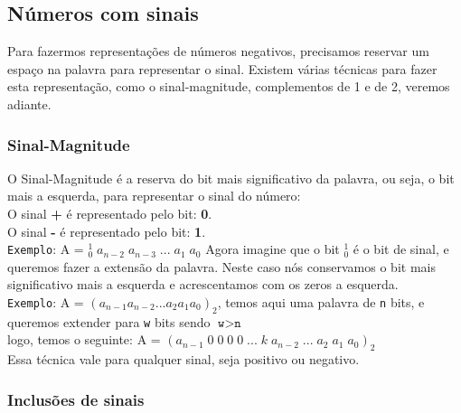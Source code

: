 \documentclass[12pt, onecolumn]{article}
\begin{document}
	\subsection{\centering Números com sinais}
	
	Para fazermos representações de números negativos, precisamos reservar 
	um espaço na palavra para representar o sinal. Existem várias técnicas 
	para fazer esta representação, como o sinal-magnitude, complementos de 
	1 e de 2, veremos adiante.

	\subsubsection{\centering Sinal-Magnitude}
	
	O Sinal-Magnitude é a reserva do bit mais significativo da palavra, 
	ou seja, o bit mais a esquerda, para representar o sinal do número: \\
	\newline
	O sinal \textbf{+} é representado pelo bit: \textbf{0}. \\
	O sinal \textbf{-} é representado pelo bit: \textbf{1}. \\
	\newline
	\texttt{Exemplo}: A = ${_0^1}\;a_{n-2}\;a_{n-3}\;...\;a_1\;a_0$
	Agora imagine que o bit $_0^1$ é o bit de sinal, e queremos fazer a
	extensão da palavra. Neste caso nós conservamos o bit mais
	significativo mais a esquerda e acrescentamos com os zeros a esquerda. \\
	\newline
	\texttt{Exemplo}: A = $(a_{n-1} a_{n-2} ... a_2 a_1 a_0)_2$, temos aqui
	uma palavra de \texttt{n} bits, e queremos extender para \texttt{w} bits
	sendo $\texttt{w} > \texttt{n}$ \\
	\newline
	logo, temos o seguinte: 
	A = $(a_{n-1}\;0\;0\;0\;0\;...\;k\;a_{n-2}\;...\;a_2\;a_1\;a_0)_2$ \\
	\newline
	Essa técnica vale para qualquer sinal, seja positivo ou negativo.
	
	\subsubsection{\centering Inclusões de sinais}
	
\end{document}
